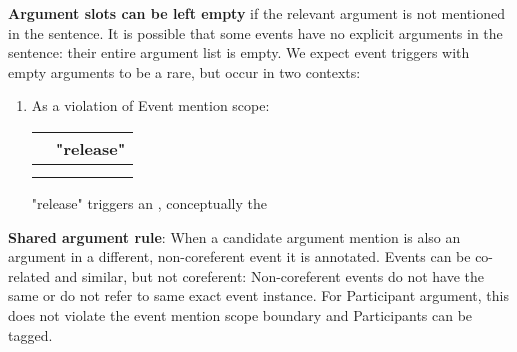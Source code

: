 \noindent\textbf{Argument slots can be left empty} if the relevant argument is not mentioned in the sentence.
It is possible that some events have no explicit arguments in the sentence: their entire argument list is empty.
We expect event triggers with empty arguments to be a rare, but occur in two contexts: 
\begin{enumerate}
    \item As a violation of Event mention scope:
        \begin{exe}
        \ex {}
            \expl \begin{tabular}{|L{6cm}|L{7cm}|} \hline
                 & "release" \\\hline
                 & \\
                 & \\
                \hline \end{tabular}
            \expl "release" triggers an , conceptually the 
        \end{exe}
\end{enumerate}

\noindent\textbf{Shared argument rule}:
When a candidate argument mention is also an argument in a different, non-coreferent event it is annotated.
Events can be co-related and similar, but not coreferent:
Non-coreferent events do not have the same  or do not refer to same exact event instance.
For Participant argument, this does not violate the event mention scope boundary and Participants can be tagged.

